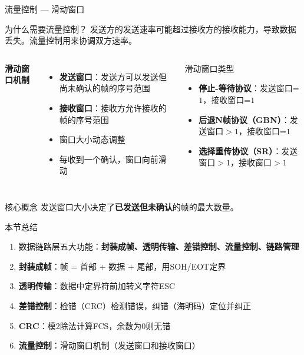 \documentclass[10pt, aspectratio=169]{beamer}
\begin{document}
\begin{frame}{流量控制 --- 滑动窗口}
    \begin{block}{为什么需要流量控制？}
        发送方的发送速率可能超过接收方的接收能力，导致数据丢失。流量控制用来协调双方速率。
    \end{block}
    \vspace{0.3em}
    \begin{columns}[T]
        \textbf{滑动窗口机制}
        \begin{itemize}
            \item \textbf{发送窗口}：发送方可以发送但尚未确认的帧的序号范围
            \item \textbf{接收窗口}：接收方允许接收的帧的序号范围
            \item 窗口大小动态调整
            \item 每收到一个确认，窗口向前滑动
        \end{itemize}
        \begin{block}{滑动窗口类型}
            \begin{itemize}
                \item \textbf{停止-等待协议}：发送窗口=$1$，接收窗口=$1$
                \item \textbf{后退N帧协议（GBN）}：发送窗口$>1$，接收窗口=$1$
                \item \textbf{选择重传协议（SR）}：发送窗口$>1$，接收窗口$>1$
            \end{itemize}
        \end{block}
    \end{columns}
    \vspace{0.3em}
    \begin{exampleblock}{核心概念}
        发送窗口大小决定了\textbf{已发送但未确认}的帧的最大数量。
    \end{exampleblock}
\end{frame}

\begin{frame}{本节总结}
    \begin{enumerate}
        \item 数据链路层五大功能：\textbf{封装成帧、透明传输、差错控制、流量控制、链路管理}
        \item \textbf{封装成帧}：帧 = 首部 + 数据 + 尾部，用SOH/EOT定界
        \item \textbf{透明传输}：数据中定界符前加转义字符ESC
        \item \textbf{差错控制}：检错（CRC）检测错误，纠错（海明码）定位并纠正
        \item \textbf{CRC}：模2除法计算FCS，余数为0则无错
        \item \textbf{流量控制}：滑动窗口机制（发送窗口和接收窗口）
    \end{enumerate}
\end{frame}
\end{document}
